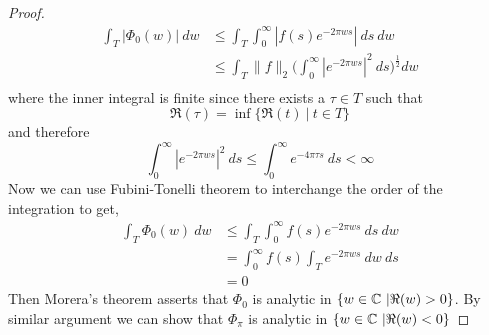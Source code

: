 \begin{proof}
  \begin{align*}
    \int_T \left| \Phi_0(w)\right| \ dw & \le \int_T \int_0^\infty \left| f(s)e^{-2\pi w s}\right| \ ds \ dw \\
    & \le \int_T \|f\|_2 \Bigg( \int_0^\infty \left|e^{-2\pi w s}\right|^2 \ ds \Bigg)^\frac{1}{2} dw \\
  \end{align*}
  where the inner integral is finite since there exists a $\tau \in T$ such that $$\Re(\tau) = \inf\{ \Re(t) \ | \ t \in T \}$$
  and therefore $$\int_0^\infty \left|e^{-2 \pi ws} \right|^2 \ ds \le \int_0^\infty e^{-4 \pi \tau s} \ ds < \infty$$
Now we can use Fubini-Tonelli theorem to interchange the order of the integration to get,
  \begin{align*}
    \int_T \Phi_0(w) \ dw & \le \int_T \int_0^\infty f(s)e^{-2\pi w s} \ ds \ dw \\
    & = \int_0^\infty f(s) \int_T e^{-2\pi w s} \ dw \ ds \\
    & = 0
  \end{align*}
Then Morera's theorem asserts that $\Phi_0$ is analytic in $\{w \in \mathbb C \ | \Re(w) > 0 \}$. By similar argument we can show that $\Phi_\pi$ is analytic in $\{w \in \mathbb C \ | \Re(w) < 0 \}$
\end{proof}

